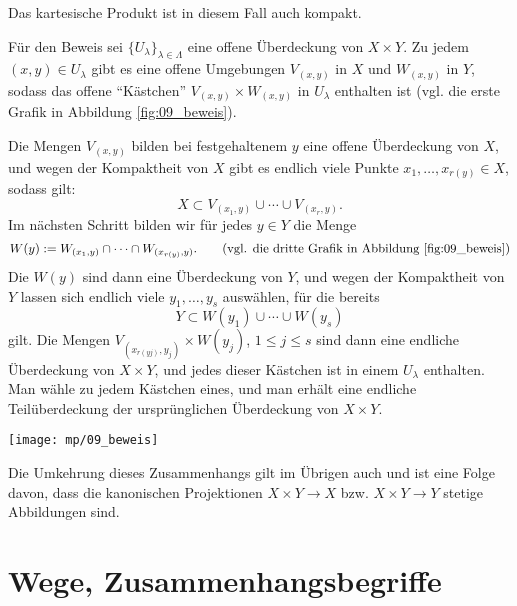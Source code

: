 \begin{antwort}
  Das kartesische Produkt ist in diesem Fall auch kompakt. 

  Für den Beweis sei $\{ U_\lambda \}_{\lambda\in\Lambda}$ 
  eine offene Überdeckung von $X\times Y$. 
  Zu jedem $(x,y)\in U_\lambda$ gibt es eine offene Umgebungen 
  $V_{(x,y)}$ in $X$ und $W_{(x,y)}$ in $Y$,  
  sodass das offene "`Kästchen"' 
  $V_{(x,y)}\times W_{(x,y)}$ 
  in $U_\lambda$ enthalten ist 
  (vgl. die erste Grafik in Abbildung \ref{fig:09_beweis}). 

  Die Mengen $V_{(x,y)}$ bilden bei festgehaltenem $y$ eine 
  offene Überdeckung von $X$, und wegen der Kompaktheit von 
  $X$ gibt es endlich viele Punkte $x_1,\ldots, x_{r(y)} \in X$,   
  sodass gilt:  
  \begin{equation}
    X \subset V_{(x_1,y)} \cup \cdots \cup V_{(x_r,y)}.
    \tag{vgl. die zweite Abbildung}
  \end{equation}
  Im nächsten Schritt bilden wir für jedes $y\in Y$ die Menge 
  \begin{equation}
    W(y) := W_{(x_1,y)} \cap \cdots \cap W_{(x_{r(y)},y)}. 
    \tag{vgl. die dritte Grafik in Abbildung \ref{fig:09_beweis}} 
  \end{equation}
  Die $W(y)$ sind dann eine Überdeckung von $Y$, und wegen der 
  Kompaktheit von $Y$ lassen sich endlich viele $y_1,\ldots,y_s$ 
  auswählen, für die bereits 
  \[
  Y \subset W(y_1)\cup \cdots \cup W(y_s)
  \]
  gilt. Die Mengen $V_{(x_{r(yj)},y_j)}\times W(y_j)$, $1\le j\le s$ 
  sind dann eine endliche Überdeckung von $X\times Y$, 
  und jedes dieser Kästchen ist 
  in einem $U_\lambda$ enthalten. Man wähle zu jedem Kästchen eines, 
  und man erhält eine endliche Teilüberdeckung der ursprünglichen 
  Überdeckung von $X\times Y$.

  \medskip

  \begin{center}
    \texttt{[image: mp/09\_beweis]}
    \label{fig:09_beweis}
  \end{center}

  Die Umkehrung dieses Zusammenhangs gilt im Übrigen auch und ist eine 
  Folge davon, dass die kanonischen Projektionen $X\times Y \to X$ bzw. 
  $X\times Y \to Y$ stetige Abbildungen sind.  
  \AntEnd
\end{antwort}



\section{Wege, Zusammenhangsbegriffe}

